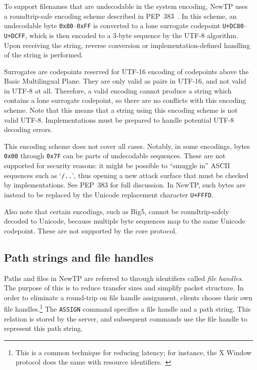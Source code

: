 To support filenames that are undecodable in the system encoding, NewTP uses a roundtrip-safe encoding scheme
described in PEP~383~\cite{pep383}. In this scheme, an undecodable byte {\tt 0x80}--{\tt 0xFF} is converted to
a lone surrogate codepoint {\tt U+DC80}--{\tt U+DCFF}, which is then encoded to a 3-byte sequence by the UTF-8
algorithm. Upon receiving the string, reverse conversion or implementation-defined handling of the string is
performed.

Surrogates are codepoints reserved for UTF-16 encoding of codepoints above the Basic Multilingual Plane. They
are only valid as pairs in UTF-16, and not valid in UTF-8 at all. Therefore, a valid encoding cannot produce
a string which contains a lone surrogate codepoint, so there are no conflicts with this encoding scheme. Note
that this means that a string using this encoding scheme is not valid UTF-8. Implementations must be prepared
to handle potential UTF-8 decoding errors.

This encoding scheme does not cover all cases. Notably, in some encodings, bytes {\tt 0x00} through {\tt 0x7F}
can be parts of undecodable sequences. These are not supported for security reasons: it might be possible to
``smuggle in'' ASCII sequences such as `{\tt /..}', thus opening a new attack surface that must be checked by
implementations. See PEP~383 for full discussion. In NewTP, such bytes are instead to be replaced by the
Unicode replacement character {\tt U+FFFD}.

Also note that certain encodings, such as Big5, cannot be roundtrip-safely decoded to Unicode, because
multiple byte sequences map to the same Unicode codepoint. These are not supported by the core protocol.

%

\subsection{Path strings and file handles}
\label{ssec:paths}

Paths and files in NewTP are referred to through identifiers called {\it file handles}. The purpose of this is
to reduce transfer sizes and simplify packet structure. In order to eliminate a round-trip on file handle
assignment, clients choose their own file handles.\footnote{This is a common technique for reducing latency;
for instance, the X Window protocol does the same with resource identifiers.~\cite{xwindow}} The {\tt ASSIGN}
command specifies a file handle and a path string. This relation is stored by the server, and subsequent
commands use the file handle to represent this path string.

